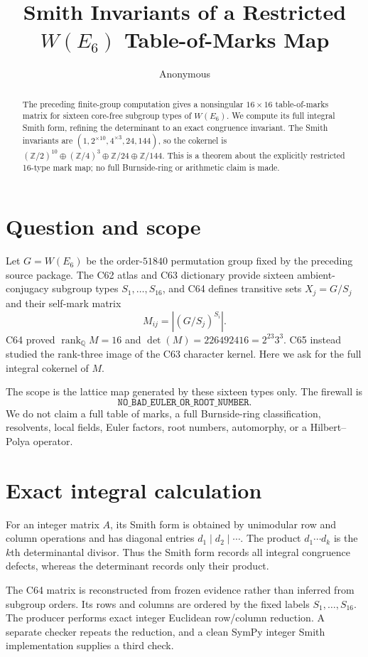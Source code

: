 \documentclass[10pt]{article}
\title{Smith Invariants of a Restricted $W(E_6)$ Table-of-Marks Map}
\author{Anonymous}
\date{}
\newcommand{\W}{W(E_6)}
\newcommand{\Q}{\mathbb Q}
\begin{document}
\maketitle

\begin{abstract}
The preceding finite-group computation gives a nonsingular $16\times16$
table-of-marks matrix for sixteen core-free subgroup types of $W(E_6)$.  We
compute its full integral Smith form, refining the determinant to an exact
congruence invariant.  The Smith invariants are
$(1,2^{\times10},4^{\times3},24,144)$, so the cokernel is
$(\mathbb Z/2)^{10}\oplus(\mathbb Z/4)^3\oplus\mathbb Z/24\oplus\mathbb
Z/144$.  This is a theorem about the explicitly restricted 16-type mark map;
no full Burnside-ring or arithmetic claim is made.
\end{abstract}

\section{Question and scope}
Let $G=\W$ be the order-$51840$ permutation group fixed by the preceding
source package.  The C62 atlas and C63 dictionary provide sixteen
ambient-conjugacy subgroup types $S_1,\ldots,S_{16}$, and C64 defines
transitive sets $X_j=G/S_j$ and their self-mark matrix
\[
 M_{ij}=|(G/S_j)^{S_i}|.
\]
C64 proved $\operatorname{rank}_{\Q}M=16$ and
$\det(M)=226492416=2^{23}3^3$.  C65 instead studied the rank-three image of
the C63 character kernel.  Here we ask for the full integral cokernel of $M$.

The scope is the lattice map generated by these sixteen types only.  The
firewall is
\[
\texttt{NO\_BAD\_EULER\_OR\_ROOT\_NUMBER}.
\]
We do not claim a full table of marks, a full Burnside-ring classification,
resolvents, local fields, Euler factors, root numbers, automorphy, or a
Hilbert--Polya operator.

\section{Exact integral calculation}
For an integer matrix $A$, its Smith form is obtained by unimodular row and
column operations and has diagonal entries $d_1\mid d_2\mid\cdots$.  The
product $d_1\cdots d_k$ is the $k$th determinantal divisor.  Thus the Smith
form records all integral congruence defects, whereas the determinant records
only their product.

The C64 matrix is reconstructed from frozen evidence rather than inferred
from subgroup orders.  Its rows and columns are ordered by the fixed labels
$S_1,\ldots,S_{16}$.  The producer performs exact integer Euclidean
row/column reduction.  A separate checker repeats the reduction, and a clean
SymPy integer Smith implementation supplies a third check.
\end{document}
